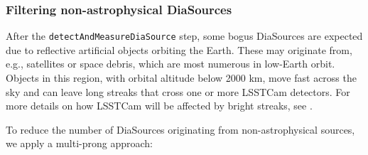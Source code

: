 \subsubsection{Filtering non-astrophysical DiaSources}
\label{sec:streaks}

After the \texttt{detectAndMeasureDiaSource} step, some bogus DiaSources are expected due to reflective artificial objects orbiting the Earth.
These may originate from, e.g., satellites or space debris, which are most numerous in low-Earth orbit.
Objects in this region, with orbital altitude below 2000 km, move fast across the sky and can leave long streaks that cross one or more LSSTCam detectors.
For more details on how LSSTCam will be affected by bright streaks, see \citet{2020AJ....160..226T,2022A&C....3900584H,2024SPIE13103E..1ZP,2024SPIE13103E..21S,2025arXiv250205418P}.

To reduce the number of DiaSources originating from non-astrophysical sources, we apply a multi-prong approach:

